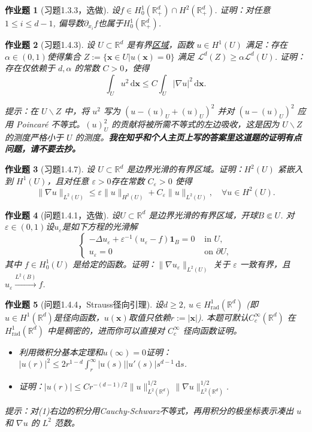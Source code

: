 \documentclass[UTF8,fontset=windows,12pt]{ctexart}
\theoremstyle{kaiti-theorem}
\newtheorem{problem}{作业题}
\numberwithin{equation}{section}
\newcommand{\R}{\mathbb{R}}
\newcommand{\bds}[1]{\boldsymbol{#1}}  %
\newcommand{\p}{\partial}
\newcommand{\lap}{\Delta}
\newcommand{\nab}{\nabla}
\newcommand{\dxx}{\,\mathrm{d}\bds{x}}
\newcommand{\ds}{\,\mathrm{d}s}
\newcommand{\iu}{\int_{U}}
\newcommand{\eps}{\varepsilon}
\newcommand{\LH}{\mathcal{L}}
\newcommand{\xx}{{\bds{x}}}
\begin{document}
\begin{problem}[习题1.3.3，选做]
设$f\in H_0^1(\R_+^d)\cap H^2(\R_+^d)$. 证明：对任意$1\leqslant i\leqslant d-1$, 偏导数$\p_{x_i} f$也属于$H_0^1(\R_+^d)$.
\end{problem}


\begin{problem}[习题1.4.3]
设 $U\subset\R^d$ 是有界\underline{区域}，函数 $u\in H^1(U)$ 满足：存在$\alpha\in(0,1)$使得集合 $Z:=\{\xx\in U|u(\xx)=0\}$ 满足 $\LH^d(Z)\geqslant \alpha\LH^d(U)$. 证明：存在仅依赖于 $d,\alpha$ 的常数 $C>0$，使得\[
\iu u^2\dxx\leqslant C\iu |\nab u|^2\dxx.
\]

提示：在 $U\backslash Z$ 中，将 $u^2$ 写为 $(u-(u)_U+(u)_U)^2$ 并对 $(u-(u)_U)^2$ 应用 Poincaré 不等式。$(u)_U^2$ 的贡献将被所需不等式的左边吸收，这是因为 $U\backslash Z$ 的测度严格小于 $U$ 的测度。\textbf{我在知乎和个人主页上写的答案里这道题的证明有点问题，请不要去抄。}
\end{problem}


\begin{problem}[习题1.4.7]
设 $U\subset\R^d$ 是边界光滑的有界区域。证明：$H^2(U)$ 紧嵌入到 $H^1(U)$，且对任意 $\eps>0$存在常数 $C_\eps >0$ 使得
 $$\|\nab u\|_{L^2(U)}\leqslant \eps\|u\|_{H^2(U)}+C_\eps \|u\|_{L^2(U)},\quad \forall u\in H^2(U).$$
\end{problem}

\begin{problem}[问题1.4.1，选做]
设$U\subset\R^d$ 是边界光滑的有界区域，开球$B\Subset U$. 对$\eps\in(0,1)$设$u_\eps$是如下方程的光滑解
\begin{equation}
\begin{cases}
-\lap u_\eps + \eps^{-1}(u_\eps -f)\mathbf{1}_{B}=0&\text{ in }U,\\
u_\eps=0&\text{ on }\p U,
\end{cases}
\end{equation}其中 $f\in H_0^1(U)$ 是给定的函数。证明：$\|\nab u_\eps\|_{L^2(U)}$ 关于 $\eps$ 一致有界，且 $u_\eps \xrightarrow{L^2(B)} f$.
\end{problem}

\begin{problem}[问题1.4.4，Strauss径向引理]
设$d\geqslant 2$, $u\in H_{\text{rad}}^1(\R^d)$ (即$u\in H^1(\R^d)$是径向函数，$u(\xx)$取值只依赖$r:=|\xx|$). 本题可默认$C_c^\infty(\R^d)$ 在 $H_{\text{rad}}^1(\R^d)$ 中是稠密的，进而你可以直接对 $C_c^\infty$ 径向函数证明。
\begin{itemize}
	\item [(1)] 利用微积分基本定理和$u(\infty)=0$证明：$|u(r)|^2\leqslant 2r^{1-d}\int_r^{\infty} |u(s)||u'(s)|s^{d-1}\ds$.
	\item [(2)] 证明：$|u(r)|\leqslant Cr^{-(d-1)/2}\|u\|_{L^2(\R^d)}^{1/2}\|\nab u\|_{L^2(\R^d)}^{1/2}$.
\end{itemize}

提示：对(1)右边的积分用Cauchy-Schwarz不等式，再用积分的极坐标表示凑出 $u$ 和 $\nab u$ 的 $L^2$ 范数。
\end{problem}
\end{document}
